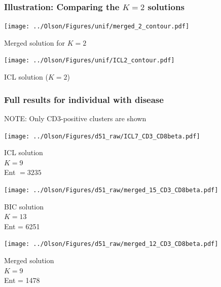 \documentclass[mathserif,compress]{beamer}
\renewcommand\;{\,}
\begin{document}
\begin{frame}\frametitle{Illustration: Comparing the $K = 2$ solutions}
\begin{center}

\begin{minipage}{0.45\linewidth}
\texttt{[image: ../Olson/Figures/unif/merged\_2\_contour.pdf]}
\begin{center}
Merged solution for $K = 2$
\end{center}
\end{minipage}
\hfill
\begin{minipage}{0.45\linewidth}
\texttt{[image: ../Olson/Figures/unif/ICL2\_contour.pdf]}
\begin{center}
ICL solution ($K = 2$)
\end{center}
\end{minipage}
\end{center}
\end{frame}

\begin{frame}\frametitle{Full results for individual with disease}
\alert{NOTE}: Only CD3-positive clusters are shown
\begin{center}
\begin{minipage}{0.3\linewidth}
\texttt{[image: ../Olson/Figures/d51\_raw/ICL7\_CD3\_CD8beta.pdf]}
\begin{center}
ICL solution
\\$K = 9$
\\Ent $=3235$ 
\end{center}
\end{minipage}
\hfill
\begin{minipage}{0.3\linewidth}
\texttt{[image: ../Olson/Figures/d51\_raw/merged\_15\_CD3\_CD8beta.pdf]}
\begin{center}
BIC solution
\\
$K = 13$
\\
Ent = 6251
\end{center}
\end{minipage}
\hfill
\begin{minipage}{0.3\linewidth}
\texttt{[image: ../Olson/Figures/d51\_raw/merged\_12\_CD3\_CD8beta.pdf]}
\begin{center}
Merged solution
\\
$K = 9$
\\
Ent = 1478
\end{center}
\end{minipage}
\end{center}
\end{frame}
\end{document}
